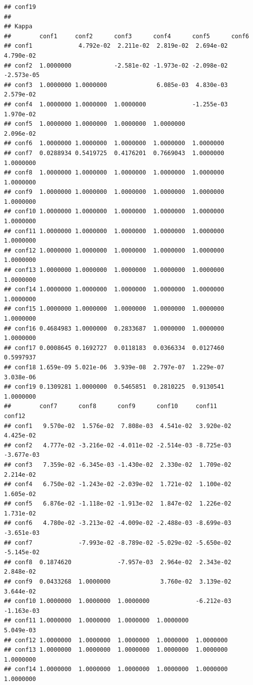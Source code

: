 \documentclass[
]{article}
\begin{document}
\begin{verbatim}
## conf19           
## 
## Kappa 
##        conf1     conf2      conf3      conf4      conf5      conf6     
## conf1             4.792e-02  2.211e-02  2.819e-02  2.694e-02  4.790e-02
## conf2  1.0000000            -2.581e-02 -1.973e-02 -2.098e-02 -2.573e-05
## conf3  1.0000000 1.0000000              6.085e-03  4.830e-03  2.579e-02
## conf4  1.0000000 1.0000000  1.0000000             -1.255e-03  1.970e-02
## conf5  1.0000000 1.0000000  1.0000000  1.0000000              2.096e-02
## conf6  1.0000000 1.0000000  1.0000000  1.0000000  1.0000000            
## conf7  0.0288934 0.5419725  0.4176201  0.7669043  1.0000000  1.0000000 
## conf8  1.0000000 1.0000000  1.0000000  1.0000000  1.0000000  1.0000000 
## conf9  1.0000000 1.0000000  1.0000000  1.0000000  1.0000000  1.0000000 
## conf10 1.0000000 1.0000000  1.0000000  1.0000000  1.0000000  1.0000000 
## conf11 1.0000000 1.0000000  1.0000000  1.0000000  1.0000000  1.0000000 
## conf12 1.0000000 1.0000000  1.0000000  1.0000000  1.0000000  1.0000000 
## conf13 1.0000000 1.0000000  1.0000000  1.0000000  1.0000000  1.0000000 
## conf14 1.0000000 1.0000000  1.0000000  1.0000000  1.0000000  1.0000000 
## conf15 1.0000000 1.0000000  1.0000000  1.0000000  1.0000000  1.0000000 
## conf16 0.4684983 1.0000000  0.2833687  1.0000000  1.0000000  1.0000000 
## conf17 0.0008645 0.1692727  0.0118183  0.0366334  0.0127460  0.5997937 
## conf18 1.659e-09 5.021e-06  3.939e-08  2.797e-07  1.229e-07  3.038e-06 
## conf19 0.1309281 1.0000000  0.5465851  0.2810225  0.9130541  1.0000000 
##        conf7      conf8      conf9      conf10     conf11     conf12    
## conf1   9.570e-02  1.576e-02  7.808e-03  4.541e-02  3.920e-02  4.425e-02
## conf2   4.777e-02 -3.216e-02 -4.011e-02 -2.514e-03 -8.725e-03 -3.677e-03
## conf3   7.359e-02 -6.345e-03 -1.430e-02  2.330e-02  1.709e-02  2.214e-02
## conf4   6.750e-02 -1.243e-02 -2.039e-02  1.721e-02  1.100e-02  1.605e-02
## conf5   6.876e-02 -1.118e-02 -1.913e-02  1.847e-02  1.226e-02  1.731e-02
## conf6   4.780e-02 -3.213e-02 -4.009e-02 -2.488e-03 -8.699e-03 -3.651e-03
## conf7             -7.993e-02 -8.789e-02 -5.029e-02 -5.650e-02 -5.145e-02
## conf8  0.1874620             -7.957e-03  2.964e-02  2.343e-02  2.848e-02
## conf9  0.0433268  1.0000000              3.760e-02  3.139e-02  3.644e-02
## conf10 1.0000000  1.0000000  1.0000000             -6.212e-03 -1.163e-03
## conf11 1.0000000  1.0000000  1.0000000  1.0000000              5.049e-03
## conf12 1.0000000  1.0000000  1.0000000  1.0000000  1.0000000            
## conf13 1.0000000  1.0000000  1.0000000  1.0000000  1.0000000  1.0000000 
## conf14 1.0000000  1.0000000  1.0000000  1.0000000  1.0000000  1.0000000 

\end{verbatim}
\end{document}
